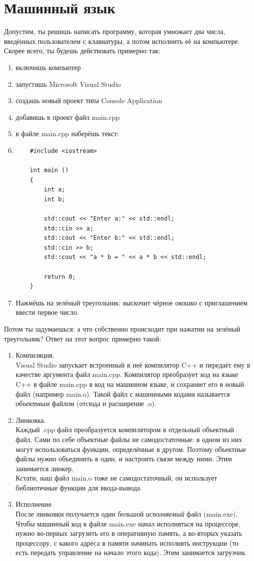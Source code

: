 \documentclass[11pt]{book}
\begin{document}
\chapter{Машинный язык}
Допустим, ты решишь написать программу, которая умножает два числа,
введённых пользователем с клавиатуры, а потом исполнить её на компьютере.
Скорее всего, ты будешь действовать примерно так:
\begin{enumerate}
\item включишь компьютер
\item запустишь Microsoft Visual Studio
\item создашь новый проект типа Console Application
\item добавишь в проект файл main.cpp
\item в файле main.cpp наберёшь текст:
\item{
\begin{verbatim}
    #include <iostream>

    int main ()
    {
        int a;
        int b;

        std::cout << "Enter a:" << std::endl;
        std::cin >> a;
        std::cout << "Enter b:" << std::endl;
        std::cin >> b;
        std::cout << "a * b = " << a * b << std::endl;

        return 0;
    }
\end{verbatim}}
\item Нажмёшь на зелёный треугольник: выскочит чёрное окошко
    с приглашением ввести первое число.
\end{enumerate}
Потом ты задумаешься: а что собственно происходит при
нажатии на зелёный треугольник? Ответ на этот вопрос
примерно такой:
\begin{enumerate}
\item Компиляция.
\\
    Visual Studio запускает встроенный в неё компилятор C++ и передаёт
    ему в качестве аргумента файл main.cpp. Компилятор преобразует код
    на языке C++ в файле main.cpp в код на машинном языке, и сохраняет
    его в новый файл (например main.o). Такой файл с машинными кодами
    называется \emph{объектным} файлом (отсюда и расширение .o).
\item Линковка.
\\
    Каждый .cpp файл преобразуется компилятором в отдельный объектный файл.
    Сами по себе объектные файлы не самодостаточные:
    в одном из них могут использоваться функции, определённые в другом.
    Поэтому объектные файлы нужно объединить в один, и настроить связи
    между ними. Этим занимается линкер.
\\
    Кстати, наш файл main.o тоже не самодостаточный, он использует
    библиотечные функции для ввода-вывода.
\item Исполнение.
\\
    После линковки получается один большой \emph{исполняемый} файл (main.exe).
    Чтобы машинный код в файле main.exe начал исполняться на процессоре,
    нужно во-первых загрузить его в оперативную память, а во-вторых
    указать процессору, с какого адреса в памяти начинать исполнять инструкции
    (то есть передать управление на начало этого кода). Этим занимается загрузчик.
\end{enumerate}
\end{document}
